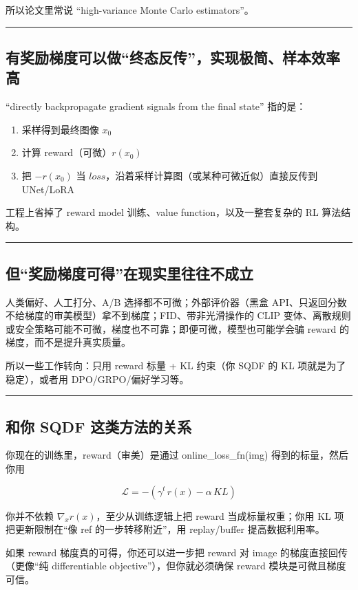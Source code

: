 所以论文里常说 “high-variance Monte Carlo estimators”。

\hrule

\subsection{有奖励梯度可以做“终态反传”，实现极简、样本效率高}

“directly backpropagate gradient signals from the final state” 指的是：

\begin{enumerate}
  \item 采样得到最终图像 \(x_0\)
  \item 计算 reward（可微）\(r(x_0)\)
  \item 把 \(-r(x_0)\) 当 \(loss\)，沿着采样计算图（或某种可微近似）直接反传到 UNet/LoRA
\end{enumerate}

工程上省掉了 reward model 训练、value function，以及一整套复杂的 RL 算法结构。

\hrule

\subsection{但“奖励梯度可得”在现实里往往不成立}

人类偏好、人工打分、A/B 选择都不可微；外部评价器（黑盒 API、只返回分数不给梯度的审美模型）拿不到梯度；FID、带非光滑操作的 CLIP 变体、离散规则或安全策略可能不可微，梯度也不可靠；即便可微，模型也可能学会骗 reward 的梯度，而不是提升真实质量。

所以一些工作转向：只用 reward 标量 + KL 约束（你 SQDF 的 KL 项就是为了稳定），或者用 DPO/GRPO/偏好学习等。

\hrule

\subsection{和你 SQDF 这类方法的关系}

你现在的训练里，reward（审美）是通过 online\_loss\_fn(img) 得到的标量，然后你用

\[
\mathcal{L} = -\left(\gamma^{t}\, r(x) - \alpha\, KL\right)
\]

你并不依赖 \(\nabla_x r(x)\)，至少从训练逻辑上把 reward 当成标量权重；你用 KL 项把更新限制在“像 ref 的一步转移附近”，用 replay/buffer 提高数据利用率。

如果 reward 梯度真的可得，你还可以进一步把 reward 对 image 的梯度直接回传（更像“纯 differentiable objective”），但你就必须确保 reward 模块是可微且梯度可信。

